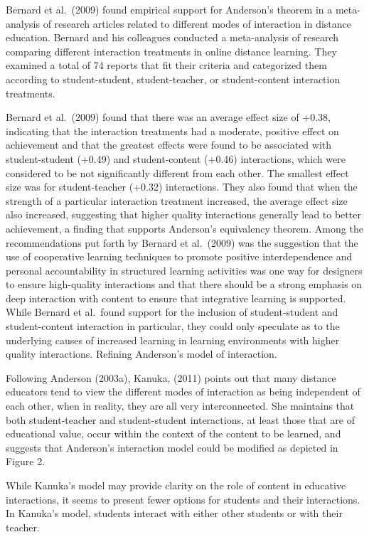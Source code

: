 \documentclass[
]{book}
\theoremstyle{definition}
\theoremstyle{definition}
\theoremstyle{definition}
\theoremstyle{definition}
\theoremstyle{remark}
\begin{document}
Bernard et al.~(2009) found empirical support for Anderson's theorem in a meta-analysis of research articles related to different modes of interaction in distance education. Bernard and his colleagues conducted a meta-analysis of research comparing different interaction treatments in online distance learning. They examined a total of 74 reports that fit their criteria and categorized them according to student-student, student-teacher, or student-content interaction treatments.

Bernard et al.~(2009) found that there was an average effect size of +0.38, indicating that the interaction treatments had a moderate, positive effect on achievement and that the greatest effects were found to be associated with student-student (+0.49) and student-content (+0.46) interactions, which were considered to be not significantly different from each other. The smallest effect size was for student-teacher (+0.32) interactions. They also found that when the strength of a particular interaction treatment increased, the average effect size also increased, suggesting that higher quality interactions generally lead to better achievement, a finding that supports Anderson's equivalency theorem.
Among the recommendations put forth by Bernard et al.~(2009) was the suggestion that the use of cooperative learning techniques to promote positive interdependence and personal accountability in structured learning activities was one way for designers to ensure high-quality interactions and that there should be a strong emphasis on deep interaction with content to ensure that integrative learning is supported. While Bernard et al.~found support for the inclusion of student-student and student-content interaction in particular, they could only speculate as to the underlying causes of increased learning in learning environments with higher quality interactions.
Refining Anderson's model of interaction.

Following Anderson (2003a), Kanuka, (2011) points out that many distance educators tend to view the different modes of interaction as being independent of each other, when in reality, they are all very interconnected. She maintains that both student-teacher and student-student interactions, at least those that are of educational value, occur within the context of the content to be learned, and suggests that Anderson's interaction model could be modified as depicted in Figure 2.

While Kanuka's model may provide clarity on the role of content in educative interactions, it seems to present fewer options for students and their interactions. In Kanuka's model, students interact with either other students or with their teacher.
\end{document}
